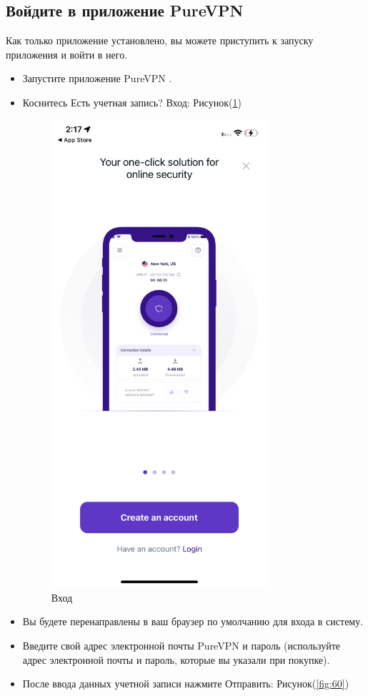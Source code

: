 \subsection{Войдите в приложение PureVPN} 
Как только приложение установлено, вы можете приступить к запуску приложения и войти в него.
\begin{itemize}
\item Запустите приложение PureVPN .
\item Коснитесь Есть учетная запись? Вход:  Рисунок(\ref{fig:59})
\begin{figure}[H]
\includegraphics[width=8cm]{45.png}
\centering
\caption{Вход}
\label{fig:59}
\end{figure}
\item Вы будете перенаправлены в ваш браузер по умолчанию для входа в систему.
\item Введите свой адрес электронной почты PureVPN и пароль (используйте адрес электронной почты и пароль, которые вы указали при покупке).
\item После ввода данных учетной записи нажмите Отправить:  Рисунок(\ref{fig:60})

\end{itemize}
